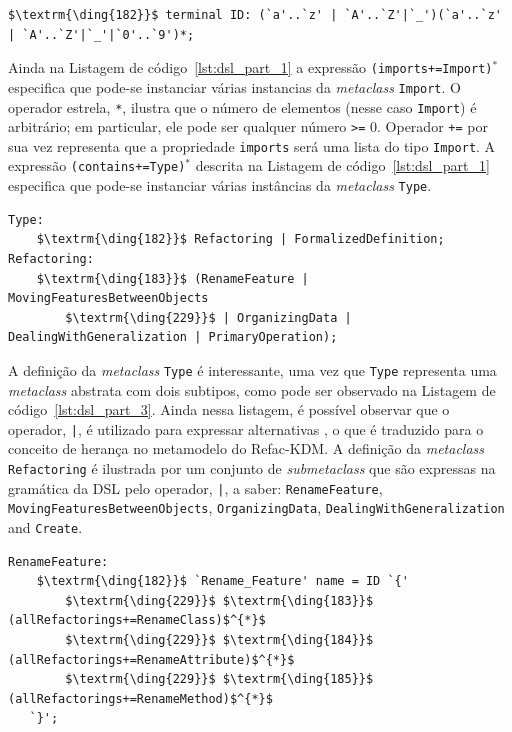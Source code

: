 \begin{lstlisting}[language=Xtext, frame=single, basicstyle=\scriptsize, mathescape=true, label={lst:dsl_part_2}, caption={Gramática da DSL - parte 2}]
	$\textrm{\ding{182}}$ terminal ID: (`a'..`z' | `A'..`Z'|`_')(`a'..`z' | `A'..`Z'|`_'|`0'..`9')*;
\end{lstlisting}

Ainda na Listagem de código~\ref{lst:dsl_part_1}  a expressão \texttt{(imports+=Import)$^{*}$} especifica que pode-se instanciar várias instancias da \textit{metaclass} \texttt{Import}. O operador estrela, \texttt{*}, ilustra que o número de elementos (nesse caso \texttt{Import}) é arbitrário; em particular, ele pode ser qualquer número \texttt{>=} 0. Operador \texttt{+=} por sua vez representa que a propriedade \texttt{imports} será uma lista do tipo \texttt{Import}. A expressão \texttt{(contains+=Type)$^{*}$} descrita na Listagem de código~\ref{lst:dsl_part_1} especifica que pode-se instanciar várias instâncias da \textit{metaclass} \texttt{Type}.

\begin{lstlisting}[language=Xtext, frame=single, basicstyle=\scriptsize, mathescape=true, label={lst:dsl_part_3}, caption={Gramática da DSL - parte 3}]
Type: 
	$\textrm{\ding{182}}$ Refactoring | FormalizedDefinition;
Refactoring: 
	$\textrm{\ding{183}}$ (RenameFeature | MovingFeaturesBetweenObjects 
		$\textrm{\ding{229}}$ | OrganizingData | DealingWithGeneralization | PrimaryOperation);
\end{lstlisting}

A definição da \textit{metaclass} \texttt{Type} é interessante, uma vez que \texttt{Type} representa uma \textit{metaclass} abstrata com dois subtipos, como pode ser observado na Listagem de código~\ref{lst:dsl_part_3}. Ainda nessa listagem, é possível observar que o operador, \texttt{|}, é utilizado para expressar alternativas , o que é traduzido para o conceito de herança no metamodelo do Refac-KDM. A definição da \textit{metaclass} \texttt{Refactoring} é ilustrada por um conjunto de \textit{submetaclass}  que são expressas na gramática da DSL pelo operador, \texttt{|}, a saber: \texttt{RenameFeature}, \texttt{MovingFeaturesBetweenObjects}, \texttt{OrganizingData}, \texttt{DealingWithGeneralization} and \texttt{Create}.

\begin{lstlisting}[language=Xtext, frame=single, basicstyle=\scriptsize, mathescape=true, label={lst:dsl_part_4}, caption={Gramática da DSL - parte 4}]
RenameFeature: 
	$\textrm{\ding{182}}$ `Rename_Feature' name = ID `{'
	 	$\textrm{\ding{229}}$ $\textrm{\ding{183}}$ (allRefactorings+=RenameClass)$^{*}$
	 	$\textrm{\ding{229}}$ $\textrm{\ding{184}}$ (allRefactorings+=RenameAttribute)$^{*}$
	 	$\textrm{\ding{229}}$ $\textrm{\ding{185}}$ (allRefactorings+=RenameMethod)$^{*}$
   `}';
\end{lstlisting}


